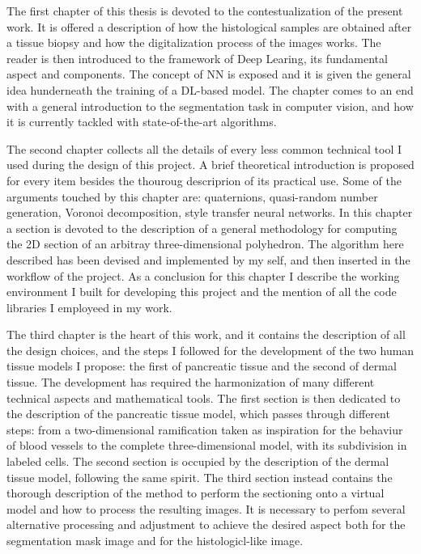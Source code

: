 The first chapter of this thesis is devoted to the contestualization of the present work. It is offered a description of how the histological samples are obtained after a tissue biopsy and how the digitalization process of the images works. The reader is then introduced to the framework of Deep Learing, its fundamental aspect and components. The concept of NN is exposed and it is given the general idea hunderneath the training of a DL-based model. The chapter comes to an end with a general introduction to the segmentation task in computer vision, and how it is currently tackled with state-of-the-art algorithms.

The second chapter collects all the details of every less common technical tool I used during the design of this project. A brief theoretical introduction is proposed for every item besides the thouroug descriprion of its practical use. Some of the arguments touched by this chapter are: quaternions, quasi-random number generation, Voronoi decomposition, style transfer neural networks. In this chapter a section is devoted to the description of a general methodology for computing the 2D section of an arbitray three-dimensional polyhedron. The algorithm here described has been devised and implemented by my self, and then inserted in the workflow of the project. As a conclusion for this chapter I describe the working environment I built for developing this project and the mention of all the code libraries I employeed in my work.

The third chapter is the heart of this work, and it contains the description of all the design choices, and the steps I followed for the development of the two human tissue models I propose: the first of pancreatic tissue and the second of dermal tissue. The development has required the harmonization of many different technical aspects and mathematical tools. The first section is then dedicated to the description of the pancreatic tissue model, which passes through different steps: from a two-dimensional ramification taken as inspiration for the behaviur of blood vessels to the complete three-dimensional model, with its subdivision in labeled cells. The second section is occupied by the description of the dermal tissue model, following the same spirit. The third section instead contains the thorough description of the method to perform the sectioning onto a virtual model and how to process the resulting images. It is necessary to perfom several alternative processing and adjustment to achieve the desired aspect both for the segmentation mask image and for the histologicl-like image.

